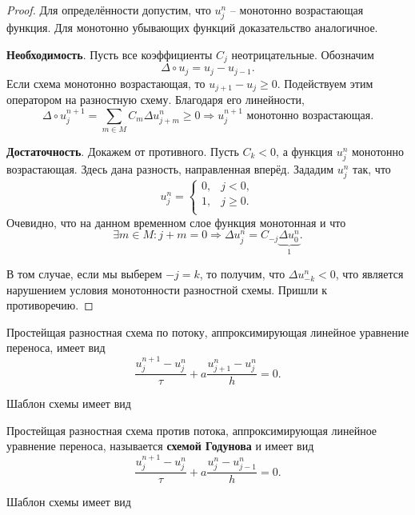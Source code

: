 \documentclass{article}
\begin{document}
\begin{proof}
	Для определённости допустим, что $u_j^n$ -- монотонно возрастающая
	функция. Для монотонно убывающих функций доказательство аналогичное.
	
	\textbf{Необходимость}. Пусть все коэффициенты $C_j$ неотрицательные.
	Обозначим
	\[\Delta\circ u_j=u_j-u_{j-1}.\]
	Если схема монотонно возрастающая, то $u_{j+1}-u_j\ge 0$. Подействуем
	этим оператором на разностную схему. Благодаря его линейности,
	\[\Delta\circ u_j^{n+1}=\sum_{m\in M}C_m\Delta u_{j+m}^{n}\ge 0
	\Rightarrow u_j^{n+1}\text{ монотонно возрастающая}.\]

	\textbf{Достаточность}. Докажем от противного. Пусть $C_k<0$, а функция
	$u_j^n$ монотонно возрастающая. Здесь дана разность, направленная
	вперёд. Зададим $u_j^n$ так, что
	\[
		u_j^n=
		\begin{cases}
			0, & j < 0, \\
			1, & j\ge 0. \\
		\end{cases}
	\]
	Очевидно, что на данном временном слое функция монотонная и что
	\[\exists m\in M:j+m=0\Rightarrow
	\Delta u_j^n=C_{-j}\underset{1}{\underbrace{\Delta u_0^n}}.\]

	В том случае, если мы выберем $-j=k$, то получим, что
	$\Delta u_{-k}^n<0$, что является нарушением условия монотонности
	разностной схемы. Пришли к противоречию.
\end{proof}

\begin{define}\label{eq:CDE_forward_scheme}
	Простейщая разностная схема по потоку, аппроксимирующая линейное
	уравнение переноса, имеет вид
	\[\frac{u_j^{n+1}-u_j^n}{\tau}+a\frac{u_{j+1}^n-u_j^n}{h}=0.\]

	Шаблон схемы имеет вид \\

	
\end{define}

\begin{define}\label{eq:godunov_scheme}
	Простейщая разностная схема против потока, аппроксимирующая линейное
	уравнение переноса, называется \textbf{схемой Годунова} и имеет вид
	\[\frac{u_j^{n+1}-u_j^n}{\tau}+a\frac{u_j^n-u_{j-1}^n}{h}=0.\]

	Шаблон схемы имеет вид \\

	
\end{define}
\end{document}
